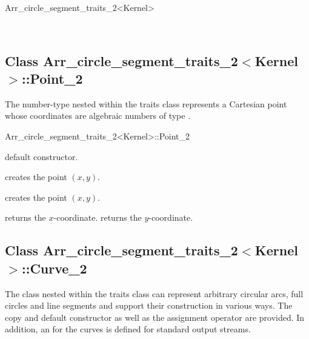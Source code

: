 \begin{ccRefClass}{Arr_circle_segment_traits_2<Kernel>}
 
\ccIsModel
     \\


\subsection*{Class 
Arr\_circle\_segment\_traits\_2$<$Kernel$>$::Point\_2}

The  number-type nested within the traits class represents
a Cartesian point whose coordinates are algebraic numbers of type
.

\begin{ccClass}{Arr_circle_segment_traits_2<Kernel>::Point_2}

\ccTypes



\ccCreation
{}

    {default constructor.}

    {creates the point $(x,y)$.}

    {creates the point $(x,y)$.}

\ccAccessFunctions

  {returns the $x$-coordinate.}
\ccGlue
{}
  {returns the $y$-coordinate.}

\end{ccClass}

\subsection*{Class 
        Arr\_circle\_segment\_traits\_2$<$Kernel$>$::Curve\_2}

The  class nested within the traits class can represent
arbitrary circular arcs, full circles and line segments and support their
construction in various ways.
The copy and default constructor as well as the assignment operator are
provided. In addition, an  for the curves is defined for
standard output streams.


\end{ccRefClass}

